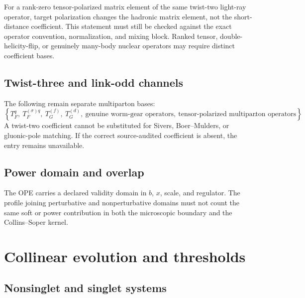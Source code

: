 \documentclass[11pt]{article}
\begin{document}
For a rank-zero tensor-polarized matrix element of the same twist-two light-ray operator, target polarization changes the hadronic matrix element, not the short-distance coefficient.  This statement must still be checked against the exact operator convention, normalization, and mixing block.  Ranked tensor, double-helicity-flip, or genuinely many-body nuclear operators may require distinct coefficient bases.

\subsection{Twist-three and link-odd channels}

The following remain separate multiparton bases:
\begin{equation}
 \left
 \{
 T_F^q,\ T_F^{(\sigma)q},\ T_G^{(f)},\ T_G^{(d)},\
 \text{genuine worm-gear operators},\
 \text{tensor-polarized multiparton operators}
 \right\}.
 \label{eq:twist3-basis}
\end{equation}
A twist-two coefficient cannot be substituted for Sivers, Boer--Mulders, or gluonic-pole matching.  If the correct source-audited coefficient is absent, the entry remains unavailable.

\subsection{Power domain and overlap}

The OPE carries a declared validity domain in \(b\), \(x\), scale, and regulator.  The profile joining perturbative and nonperturbative domains must not count the same soft or power contribution in both the microscopic boundary and the Collins--Soper kernel.

\section{Collinear evolution and thresholds}
\label{sec:collinear}

\subsection{Nonsinglet and singlet systems}
\end{document}
